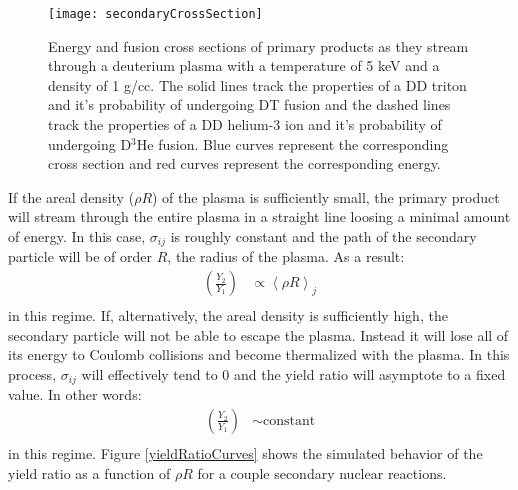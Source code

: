 	\begin{figure}[!h]
		\centering
		\texttt{[image: secondaryCrossSection]}
		\caption[Secondary fusion cross sections]{Energy and fusion cross sections of primary products as they stream through a deuterium plasma with a temperature of 5 keV and a density of 1 g/cc. The solid lines track the properties of a DD triton and it's probability of undergoing DT fusion and the dashed lines track the properties of a DD helium-3 ion and it's probability of undergoing D$^3$He fusion. Blue curves represent the corresponding cross section and red curves represent the corresponding energy.  }
		\label{secondaryCrossSection}
	\end{figure}
	
	 If the areal density ($\rho R$) of the plasma is sufficiently small, the primary product will stream through the entire plasma in a straight line loosing a minimal amount of energy. In this case, $\sigma_{ij}$ is roughly constant and the path of the secondary particle will be of order $R$, the radius of the plasma. As a result:
	\begin{equation}
		\begin{split}
			\left(\frac{Y_2}{Y_1}\right) 
			& \propto \left<\rho R\right>_j \\
		\end{split}
	\end{equation}
	in this regime. If, alternatively, the areal density is sufficiently high, the secondary particle will not be able to escape the plasma. Instead it will lose all of its energy to Coulomb collisions and become thermalized with the plasma. In this process, $\sigma_{ij}$ will effectively tend to 0 and the yield ratio will asymptote to a fixed value. In other words:
	\begin{equation}
		\begin{split}
			\left(\frac{Y_2}{Y_1}\right) 
			& \sim \text{constant} \\
		\end{split}
	\end{equation}
	in this regime.	Figure \ref{yieldRatioCurves} shows the simulated behavior of the yield ratio as a function of $\rho R$ for a couple secondary nuclear reactions. 
	

